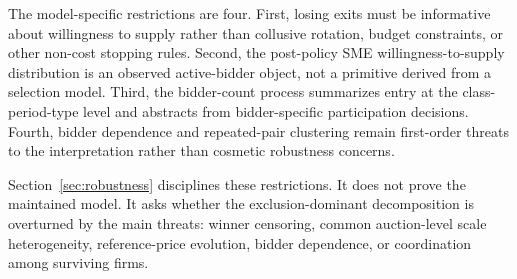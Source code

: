 The model-specific restrictions are four. First, losing exits must be
informative about willingness to supply rather than collusive rotation,
budget constraints, or other non-cost stopping rules. Second, the
post-policy SME willingness-to-supply distribution is an observed
active-bidder object, not a primitive derived from a selection model.
Third, the bidder-count process summarizes entry at the class-period-type
level and abstracts from bidder-specific participation decisions. Fourth,
bidder dependence and repeated-pair clustering remain first-order threats
to the interpretation rather than cosmetic robustness concerns.

Section~\ref{sec:robustness} disciplines these restrictions. It does not
prove the maintained model. It asks whether the exclusion-dominant
decomposition is overturned by the main threats: winner censoring, common
auction-level scale heterogeneity, reference-price evolution, bidder
dependence, or coordination among surviving firms.
